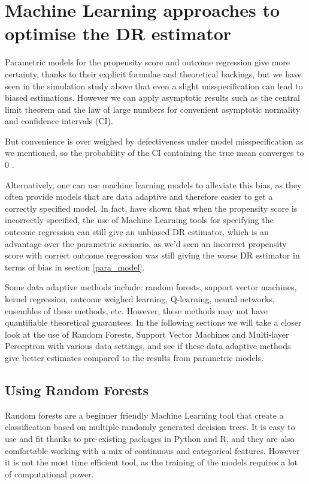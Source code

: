 \documentclass[12pt,twoside]{article}
\begin{document}
\section{Machine Learning approaches to optimise the DR estimator}

Parametric models for the propensity score and outcome regression give more certainty, thanks to their explicit formulae and theoretical backings, but we have seen in the simulation study above that even a slight misspecification can lead to biased estimations. However we can apply asymptotic results such as the central limit theorem and the law of large numbers for convenient asymptotic normality and confidence intervals (CI).

But convenience is over weighed by defectiveness under model misspecification as we mentioned, so the probability of the CI containing the true mean converges to 0 \citep{diaz}.

Alternatively, one can use machine learning models to alleviate this bias, as they often provide models that are data adaptive and therefore easier to get a correctly specified model. In fact, \citet{ps_SL} have shown that when the propensity score is incorrectly specified, the use of Machine Learning tools for specifying the outcome regression can still give an unbiased DR estimator, which is an advantage over the parametric scenario, as we'd seen an incorrect propensity score with correct outcome regression was still giving the worse DR estimator in terms of bias in section \ref{para_model}.

Some data adaptive methods include: random forests, support vector machines, kernel regression, outcome weighed learning, Q-learning, neural networks, ensembles of these methods, etc. However, these methods may not have quantifiable theoretical guarantees. In the following sections we will take a closer look at the use of Random Forests, Support Vector Machines and Multi-layer Perceptron with various data settings, and see if these data adaptive methods give better estimates compared to the results from parametric models.

\subsection{Using Random Forests}

Random forests are a beginner friendly Machine Learning tool that create a classification based on multiple randomly generated decision trees. It is easy to use and fit thanks to pre-existing packages in Python and R, and they are also comfortable working with a mix of continuous and categorical features. However it is not the most time efficient tool, as the training of the models requires a lot of computational power. 
\end{document}
